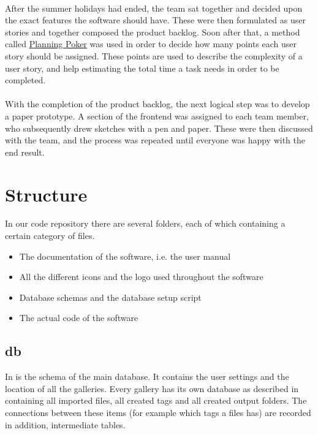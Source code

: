 \paragraph{}
After the summer holidays had ended, the team sat together and decided upon the exact features the software should have. These were then formulated as user stories and together composed the product backlog. Soon after that, a method called \href{https://en.wikipedia.org/wiki/Planning_poker}{Planning Poker} was used in order to decide how many points each user story should be assigned. These points are used to describe the complexity of a user story, and help estimating the total time a task needs in order to be completed.

\paragraph{}
With the completion of the product backlog, the next logical step was to develop a paper prototype. A section of the frontend was assigned to each team member, who subsequently drew sketches with a pen and paper. These were then discussed with the team, and the process was repeated until everyone was happy with the end result.




\section{Structure}
\def \kapitelautor {Clemens Stadlbauer}

In our code repository there are several folders, each of which containing a
certain category of files.

\begin{itemize}
	\item[\tfpath{doc/}] The documentation of the software, i.e. the user manual
	\item[\tfpath{icons/}] All the different icons and the logo used throughout the
	software
	\item[\tfpath{db/}] Database schemas and the database setup script
	\item[\tfpath{src/}] The actual code of the software
\end{itemize}

\subsection{db}
In  is the schema of the main database. It contains the user
settings and the location of all the galleries. Every gallery has its own
database as described in  containing all imported files,
all created tags and all created output folders. The connections between these
items (for example which tags a files has) are recorded in addition,
intermediate tables.

